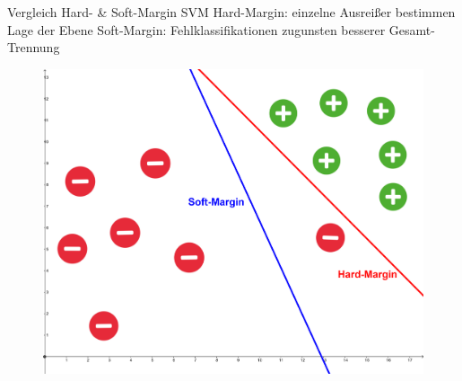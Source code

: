 \documentclass[ngerman]{beamer}
\begin{document}
\begin{frame}{Vergleich Hard- \& Soft-Margin SVM}
	Hard-Margin: einzelne Ausreißer bestimmen Lage der Ebene
	Soft-Margin: Fehlklassifikationen zugunsten besserer Gesamt-Trennung
	
	\begin{center}
		\begin{figure}
			\includegraphics[width=\textwidth,height=0.7\textheight,keepaspectratio]{assets/hard_vs_soft_margin.png}
		\end{figure}
	\end{center}
	
\end{frame}
\end{document}
